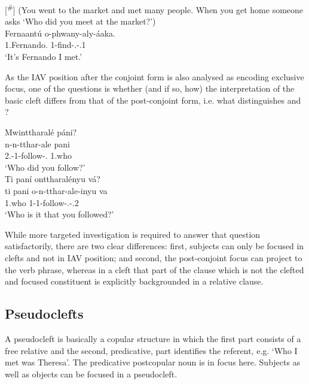 \documentclass[output=paper]{langscibook}
\begin{document}
\z

\ea
[\textsuperscript{\#}]{
\label{bkm:Ref109587813}
(You went to the market and met many people. When you get home someone asks ‘Who did you meet at the market?’)\\
\gll
Fernaantú  o-phwany-aly-áaka.\\
1.Fernando.\PRL{}  1-find-\PFV{}.\REL{}-\POSS{}.1\SG{}\\
\glt
‘It’s Fernando I met.’\\
}


\z

As the IAV position after the conjoint form is also analysed as encoding exclusive focus, one of the questions is whether (and if so, how) the interpretation of the basic cleft differs from that of the post-conjoint form, i.e. what distinguishes  and ?

\ea
\label{bkm:Ref129853814}
\ea
\label{bkm:Ref129853814:a}
Mwinttharalé páni?\\
\gll
n-n-tthar-ale  pani\\
2\PL{}.\SM{}-1\OM{}-follow-\PFV{}.\CJ{}  1.who\\
\glt
‘Who did you follow?’\\

\ex
\label{bkm:Ref129853814:b}
Ti paní onttharalényu vá?\\
\gll
ti  pani  o-n-tthar-ale-inyu  va\\
\COP{}  1.who  1-1\OM{}-follow-\PFV{}.\REL{}-\POSS{}.2\PL{}  \PP{}\\
\glt
‘Who is it that you followed?’\\


\z
\z

While more targeted investigation is required to answer that question satisfactorily, there are two clear differences: first, subjects can only be focused in clefts and not in IAV position; and second, the post-conjoint focus can project to the verb phrase, whereas in a cleft that part of the clause which is not the clefted and focused constituent is explicitly backgrounded in a relative clause.

\subsection{Pseudoclefts}
\label{bkm:Ref95375695}
A pseudocleft is basically a copular structure in which the first part consists of a free relative and the second, predicative, part identifies the referent, e.g. ‘Who I met was Theresa’. The predicative postcopular noun is in focus here. Subjects  as well as objects  can be focused in a pseudocleft.
\end{document}
